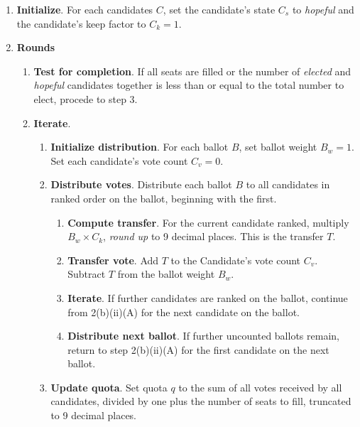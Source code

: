 \begin{enumerate}
    \item \textbf{Initialize}.  For each candidates $C$, set the candidate's state $C_s$ to \textit{hopeful} and the candidate's keep factor to $C_k = 1$.

    \item \textbf{Rounds}
    \begin{enumerate}
        \item \textbf{Test for completion}.  If all seats are filled or the number of \textit{elected} and \textit{hopeful} candidates together is less than or equal to the total number to elect, procede to step 3.

        \item \textbf{Iterate}.
        \begin{enumerate}
            \item \textbf{Initialize distribution}.  For each ballot $B$, set ballot weight $B_w = 1$.  Set each candidate's vote count $C_v = 0$.

            \item \textbf{Distribute votes}.  Distribute each ballot $B$ to all candidates in ranked order on the ballot, beginning with the first.
            \begin{enumerate}
                \item \textbf{Compute transfer}.  For the current candidate ranked, multiply $B_w \times C_k$, \textit{round up} to 9 decimal places.  This is the transfer $T$.

                \item \textbf{Transfer vote}.  Add $T$ to the Candidate's vote count $C_v$.  Subtract $T$ from the ballot weight $B_w$.

                \item \textbf{Iterate}.  If further candidates are ranked on the ballot, continue from 2(b)(ii)(A) for the next candidate on the ballot.

                \item \textbf{Distribute next ballot}. If further uncounted ballots remain, return to step 2(b)(ii)(A) for the first candidate on the next ballot.
            \end{enumerate}

            \item \textbf{Update quota}.  Set quota $q$ to the sum of all votes received by all candidates, divided by one plus the number of seats to fill, truncated to 9 decimal places.


\end{enumerate}
\end{enumerate}
\end{enumerate}
